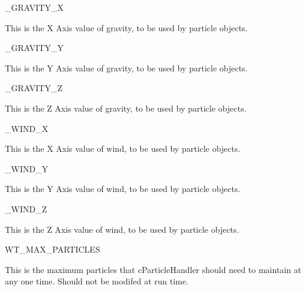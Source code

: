 \begin{DoxyItemize}
\item \_\-GRAVITY\_\-X
\begin{DoxyItemize}
\item This is the X Axis value of gravity, to be used by particle objects.
\end{DoxyItemize}
\end{DoxyItemize}
\begin{DoxyItemize}
\item \_\-GRAVITY\_\-Y
\begin{DoxyItemize}
\item This is the Y Axis value of gravity, to be used by particle objects.
\end{DoxyItemize}
\end{DoxyItemize}
\begin{DoxyItemize}
\item \_\-GRAVITY\_\-Z
\begin{DoxyItemize}
\item This is the Z Axis value of gravity, to be used by particle objects.
\end{DoxyItemize}
\end{DoxyItemize}
\begin{DoxyItemize}
\item \_\-WIND\_\-X
\begin{DoxyItemize}
\item This is the X Axis value of wind, to be used by particle objects.
\end{DoxyItemize}
\end{DoxyItemize}
\begin{DoxyItemize}
\item \_\-WIND\_\-Y
\begin{DoxyItemize}
\item This is the Y Axis value of wind, to be used by particle objects.
\end{DoxyItemize}
\end{DoxyItemize}
\begin{DoxyItemize}
\item \_\-WIND\_\-Z
\begin{DoxyItemize}
\item This is the Z Axis value of wind, to be used by particle objects.
\end{DoxyItemize}
\end{DoxyItemize}
\begin{DoxyItemize}
\item WT\_\-MAX\_\-PARTICLES
\begin{DoxyItemize}
\item This is the maximum particles that cParticleHandler should need to maintain at any one time. Should not be modifed at run time.
\end{DoxyItemize}
\end{DoxyItemize}
